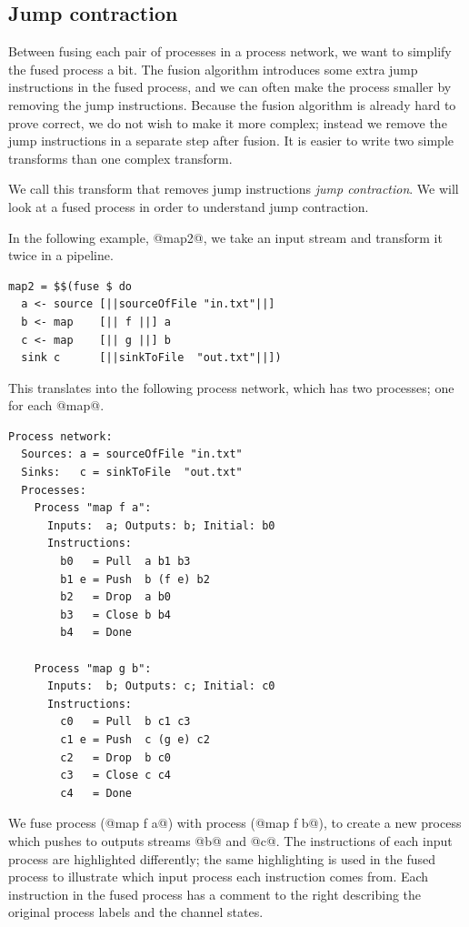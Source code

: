 \fi

\subsection{Jump contraction}
Between fusing each pair of processes in a process network, we want to simplify the fused process a bit.
The fusion algorithm introduces some extra jump instructions in the fused process, and we can often make the process smaller by removing the jump instructions.
Because the fusion algorithm is already hard to prove correct, we do not wish to make it more complex; instead we remove the jump instructions in a separate step after fusion.
It is easier to write two simple transforms than one complex transform.

We call this transform that removes jump instructions \emph{jump contraction}.
We will look at a fused process in order to understand jump contraction.

In the following example, @map2@, we take an input stream and transform it twice in a pipeline.

\begin{lstlisting}
map2 = $$(fuse $ do
  a <- source [||sourceOfFile "in.txt"||]
  b <- map    [|| f ||] a
  c <- map    [|| g ||] b
  sink c      [||sinkToFile  "out.txt"||])
\end{lstlisting}

This translates into the following process network, which has two processes; one for each @map@.

\begin{lstlisting}[linebackgroundcolor={
  \hilineFst{8}
  \hilineFst{9}
  \hilineFst{10}
  \hilineFst{11}
  \hilineFst{12}
  \hilineSnd{17}
  \hilineSnd{18}
  \hilineSnd{19}
  \hilineSnd{20}
  \hilineSnd{21}
  }]
Process network:
  Sources: a = sourceOfFile "in.txt"
  Sinks:   c = sinkToFile  "out.txt"
  Processes:
    Process "map f a":
      Inputs:  a; Outputs: b; Initial: b0
      Instructions:
        b0   = Pull  a b1 b3
        b1 e = Push  b (f e) b2
        b2   = Drop  a b0
        b3   = Close b b4        
        b4   = Done

    Process "map g b":
      Inputs:  b; Outputs: c; Initial: c0
      Instructions:
        c0   = Pull  b c1 c3      
        c1 e = Push  c (g e) c2     
        c2   = Drop  b c0
        c3   = Close c c4         
        c4   = Done
\end{lstlisting}

We fuse process (@map f a@) with process (@map f b@), to create a new process which pushes to outputs streams @b@ and @c@.
The instructions of each input process are highlighted differently; the same highlighting is used in the fused process to illustrate which input process each instruction comes from.
Each instruction in the fused process has a comment to the right describing the original process labels and the channel states.

